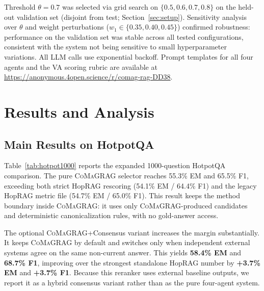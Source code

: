 \documentclass[runningheads]{llncs}
\newcommand{\sys}{\textsc{CoMaGRAG}\xspace}
\begin{document}
Threshold $\theta=0.7$ was selected via grid search on $\{0.5,0.6,0.7,0.8\}$
on the held-out validation set (disjoint from test; Section~\ref{sec:setup}).
Sensitivity analysis over $\theta$ and weight perturbations
($w_1\in\{0.35,0.40,0.45\}$) confirmed robustness: performance on the
validation set was stable across all tested configurations,
consistent with the system not being sensitive to small hyperparameter
variations. All LLM calls use exponential backoff. Prompt templates for all
four agents and the VA scoring rubric are available at
\url{https://anonymous.4open.science/r/comag-rag-DD38}.

\section{Results and Analysis}
\label{sec:results}

\subsection{Main Results on HotpotQA}

Table~\ref{tab:hotpot1000} reports the expanded 1000-question HotpotQA
comparison. The pure \sys selector reaches 55.3\% EM and 65.5\% F1, exceeding
both strict HopRAG rescoring (54.1\% EM / 64.4\% F1) and the legacy HopRAG
metric file (54.7\% EM / 65.0\% F1). This result keeps the method boundary
inside \sys: it uses only \sys-produced candidates and deterministic
canonicalization rules, with no gold-answer access.

The optional \sys+Consensus variant increases the margin substantially. It
keeps \sys by default and switches only when independent external systems agree
on the same non-current answer. This yields \textbf{58.4\% EM} and
\textbf{68.7\% F1}, improving over the strongest standalone HopRAG number by
\textbf{+3.7\% EM} and \textbf{+3.7\% F1}. Because this reranker uses external
baseline outputs, we report it as a hybrid consensus variant rather than as the
pure four-agent system.
\end{document}
